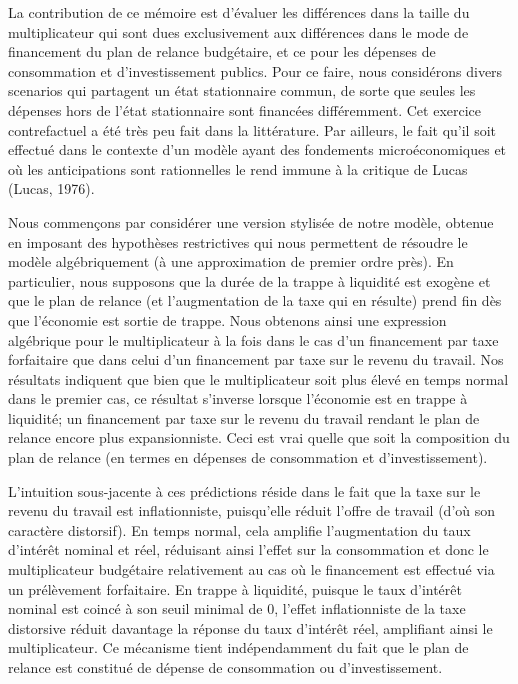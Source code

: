 \documentclass[12pt,letterpaper]{article}
\begin{document}
La contribution de ce mémoire est d’évaluer les différences dans la taille du multiplicateur qui sont dues exclusivement aux différences dans le mode de financement du plan de relance budgétaire, et ce pour les dépenses de consommation et d’investissement publics. Pour ce faire, nous considérons divers scenarios qui partagent un état stationnaire commun, de sorte que seules les dépenses hors de l’état stationnaire sont financées différemment. Cet exercice contrefactuel a été très peu fait dans la littérature. Par ailleurs, le fait qu’il soit effectué dans le contexte d’un modèle ayant des fondements microéconomiques et où les anticipations sont rationnelles le rend immune à la critique de Lucas (Lucas, 1976).

Nous commençons par considérer une version stylisée de notre modèle, obtenue en imposant des hypothèses restrictives qui nous permettent de résoudre le modèle algébriquement (à une approximation de premier ordre près). En particulier, nous supposons que la durée de la trappe à liquidité est exogène et que le plan de relance (et l’augmentation de la taxe qui en résulte) prend fin dès que l’économie est sortie de trappe. Nous obtenons ainsi une expression algébrique pour le multiplicateur à la fois dans le cas d’un financement par taxe forfaitaire que dans celui d’un financement par taxe sur le revenu du travail. Nos résultats indiquent que bien que le multiplicateur soit plus élevé en temps normal dans le premier cas, ce résultat s’inverse lorsque l’économie est en trappe à liquidité; un financement par taxe sur le revenu du travail rendant le plan de relance encore plus expansionniste. Ceci est vrai quelle que soit la composition du plan de relance (en termes en dépenses de consommation et d’investissement).

L’intuition sous-jacente à ces prédictions réside dans le fait que la taxe sur le revenu du travail est inflationniste, puisqu’elle réduit l’offre de travail (d’où son caractère distorsif). En temps normal, cela amplifie l’augmentation du taux d’intérêt nominal et réel, réduisant ainsi l’effet sur la consommation et donc le multiplicateur budgétaire relativement au cas où le financement est effectué via un prélèvement forfaitaire. En trappe à liquidité, puisque le taux d’intérêt nominal est coincé à son seuil minimal de 0, l’effet inflationniste de la taxe distorsive réduit davantage la réponse du taux d’intérêt réel, amplifiant ainsi le multiplicateur. Ce mécanisme tient indépendamment du fait que le plan de relance est constitué de dépense de consommation ou d’investissement.
\end{document}

